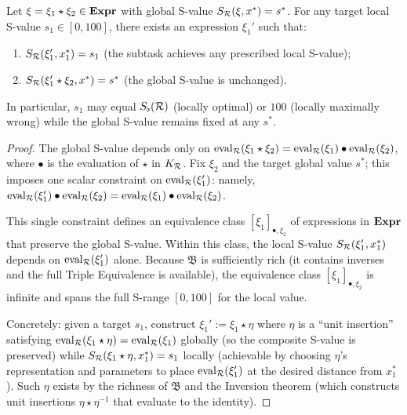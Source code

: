 \begin{theorem}\label{thm:unconstrained}
Let $\xi = \xi_1 \star \xi_2 \in \mathbf{Expr}$ with global S-value $S_{\mathcal{R}}(\xi, x^*) = s^*$. For any target local S-value $s_1 \in [0, 100]$, there exists an expression $\xi_1'$ such that:
\begin{enumerate}[nosep, label=(\roman*)]
  \item $S_{\mathcal{R}}(\xi_1', x^*_1) = s_1$ (the subtask achieves any prescribed local S-value);
  \item $S_{\mathcal{R}}(\xi_1' \star \xi_2, x^*) = s^*$ (the global S-value is unchanged).
\end{enumerate}
In particular, $s_1$ may equal $S_{\flat}(\mathcal{R})$ (locally optimal) or $100$ (locally maximally wrong) while the global S-value remains fixed at any $s^*$.
\end{theorem}

\begin{proof}
The global S-value depends only on $\mathrm{eval}_{\mathcal{R}}(\xi_1 \star \xi_2) = \mathrm{eval}_{\mathcal{R}}(\xi_1) \bullet \mathrm{eval}_{\mathcal{R}}(\xi_2)$, where $\bullet$ is the evaluation of $\star$ in $K_{\mathcal{R}}$. Fix $\xi_2$ and the target global value $s^*$; this imposes one scalar constraint on $\mathrm{eval}_{\mathcal{R}}(\xi_1')$: namely, $\mathrm{eval}_{\mathcal{R}}(\xi_1') \bullet \mathrm{eval}_{\mathcal{R}}(\xi_2) = \mathrm{eval}_{\mathcal{R}}(\xi_1) \bullet \mathrm{eval}_{\mathcal{R}}(\xi_2)$.

This single constraint defines an equivalence class $[\xi_1]_{\bullet, \xi_2}$ of expressions in $\mathbf{Expr}$ that preserve the global S-value. Within this class, the local S-value $S_{\mathcal{R}}(\xi_1', x^*_1)$ depends on $\mathrm{eval}_{\mathcal{R}}(\xi_1')$ alone. Because $\mathfrak{B}$ is sufficiently rich (it contains inverses and the full Triple Equivalence is available), the equivalence class $[\xi_1]_{\bullet, \xi_2}$ is infinite and spans the full S-range $[0,100]$ for the local value.

Concretely: given a target $s_1$, construct $\xi_1' := \xi_1 \star \eta$ where $\eta$ is a ``unit insertion'' satisfying $\mathrm{eval}_{\mathcal{R}}(\xi_1 \star \eta) = \mathrm{eval}_{\mathcal{R}}(\xi_1)$ globally (so the composite S-value is preserved) while $S_{\mathcal{R}}(\xi_1 \star \eta, x^*_1) = s_1$ locally (achievable by choosing $\eta$'s representation and parameters to place $\mathrm{eval}_{\mathcal{R}}(\xi_1')$ at the desired distance from $x^*_1$). Such $\eta$ exists by the richness of $\mathfrak{B}$ and the Inversion theorem (which constructs unit insertions $\eta \star \eta^{-1}$ that evaluate to the identity).
\end{proof}


